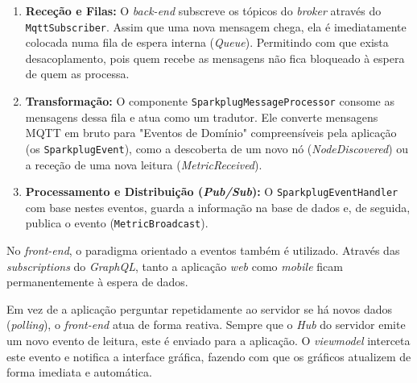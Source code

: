 \begin{enumerate}
	\item \textbf{Receção e Filas:} O \textit{back-end} subscreve os tópicos do \textit{broker} através do \texttt{MqttSubscriber}. Assim que uma nova mensagem chega, ela é imediatamente colocada numa fila de espera interna (\textit{Queue}). Permitindo com que exista desacoplamento, pois quem recebe as mensagens não fica bloqueado à espera de quem as processa.
	
	\item \textbf{Transformação:} O componente \texttt{SparkplugMessageProcessor} consome as mensagens dessa fila e atua como um tradutor. Ele converte mensagens MQTT em bruto para "Eventos de Domínio" compreensíveis pela aplicação (os \texttt{SparkplugEvent}), como a descoberta de um novo nó (\textit{NodeDiscovered}) ou a receção de uma nova leitura (\textit{MetricReceived}).
	
	\item \textbf{Processamento e Distribuição (\textit{Pub/Sub}):} O \texttt{SparkplugEventHandler} com base nestes eventos, guarda a informação na base de dados e, de seguida, publica o evento  (\texttt{MetricBroadcast}).
\end{enumerate}


No \textit{front-end}, o paradigma orientado a eventos também é utilizado. Através das \textit{subscriptions} do \textit{GraphQL}, tanto a aplicação \textit{web} como \textit{mobile} ficam permanentemente à espera de dados.

Em vez de a aplicação perguntar repetidamente ao servidor se há novos dados (\textit{polling}), o \textit{front-end} atua de forma reativa. Sempre que o \textit{Hub} do servidor emite um novo evento de leitura, este é enviado para a aplicação. O \textit{viewmodel} interceta este evento e notifica a interface gráfica, fazendo com que os gráficos atualizem de forma imediata e automática.
